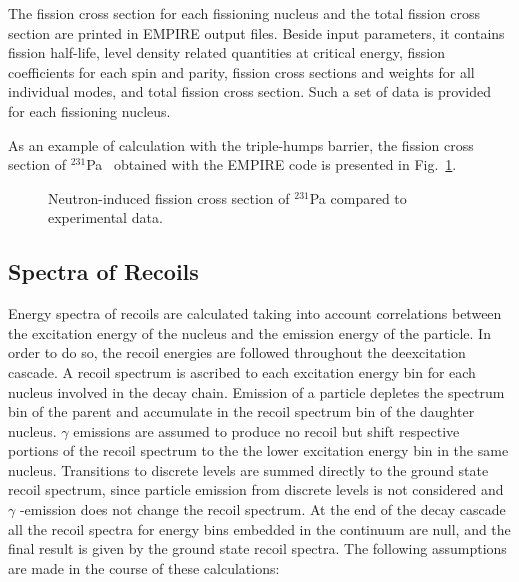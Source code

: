 The fission cross section for each fissioning nucleus and the total fission
cross section are printed in EMPIRE output files.  Beside input parameters,
it contains fission half-life, level density related quantities at critical
energy,  fission coefficients for each spin and parity, fission cross
sections and weights for all individual modes, and total fission cross
section. Such a set of data is provided for each fissioning nucleus.

As an example of calculation with the triple-humps barrier, the fission
cross section of $^{231}$Pa~\cite{sin01} obtained with the EMPIRE code is
presented in Fig.~\ref{pa231}.
\begin{figure}[htbp]
\caption{Neutron-induced fission cross section of $^{231}$Pa compared to
experimental data.}
\label{pa231}
\end{figure}

\subsection{Spectra of Recoils}

Energy spectra of recoils are calculated taking into account correlations
between the excitation energy of the nucleus and the emission energy of the
particle. In order to do so, the recoil energies are followed throughout the
deexcitation cascade. A recoil spectrum is ascribed to each excitation
energy bin for each nucleus involved in the decay chain. Emission of a
particle depletes the spectrum bin of the parent and accumulate in the
recoil spectrum bin of the daughter nucleus. $\gamma$ emissions are assumed
to produce no recoil but shift respective portions of the recoil spectrum to
the the lower excitation energy bin in the same nucleus. Transitions to
discrete levels are summed directly to the ground state recoil spectrum,
since particle emission from discrete levels is not considered and $\gamma$%
-emission does not change the recoil spectrum. At the end of the decay
cascade all the recoil spectra for energy bins embedded in the continuum are
null, and the final result is given by the ground state recoil spectra. The
following assumptions are made in the course of these calculations:

